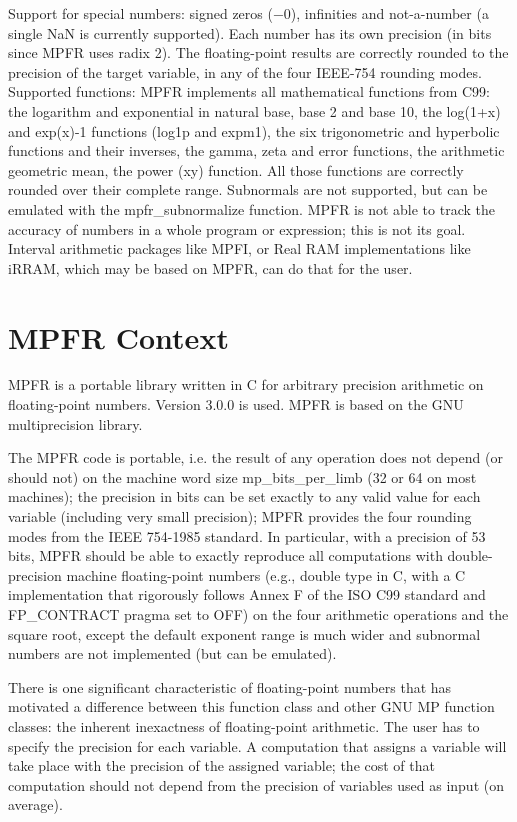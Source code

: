 Support for special numbers: signed zeros (−0), infinities and not-a-number (a single NaN is currently supported).
Each number has its own precision (in bits since MPFR uses radix 2). The floating-point results are correctly rounded to the precision of the target variable, in any of the four IEEE-754 rounding modes.
Supported functions: MPFR implements all mathematical functions from C99: the logarithm and exponential in natural base, base 2 and base 10, the log(1+x) and exp(x)-1 functions (log1p and expm1), the six trigonometric and hyperbolic functions and their inverses, the gamma, zeta and error functions, the arithmetic geometric mean, the power (xy) function. All those functions are correctly rounded over their complete range.
Subnormals are not supported, but can be emulated with the mpfr\_subnormalize function.
MPFR is not able to track the accuracy of numbers in a whole program or expression; this is not its goal. Interval arithmetic packages like MPFI, or Real RAM implementations like iRRAM, which may be based on MPFR, can do that for the user.




\section{MPFR Context}
\label{MPFRContext}

MPFR is a portable library written in C for arbitrary precision arithmetic on floating-point numbers. Version 3.0.0 is used. MPFR is based on the GNU multiprecision library.

\vspace{0.3cm}
The MPFR code is portable, i.e. the result of any operation does not depend (or should not) on the machine word size mp\_bits\_per\_limb (32 or 64 on most machines); 
the precision in bits can be set exactly to any valid value for each variable (including very small precision); 
MPFR provides the four rounding modes from the IEEE 754-1985 standard. 
In particular, with a precision of 53 bits, MPFR should be able to exactly reproduce all computations with double-precision machine floating-point numbers (e.g., double type in C, with a C implementation that rigorously follows Annex F of the ISO C99 standard and FP\_CONTRACT pragma set to OFF) on the four arithmetic operations and the square root, except the default exponent range is much wider and subnormal numbers are not implemented (but can be emulated). 

\vspace{0.3cm}
There is one significant characteristic of floating-point numbers that has motivated a difference between this function class and other GNU MP function classes: the inherent inexactness of floating-point arithmetic. The user has to specify the precision for each variable. A computation that assigns a variable will take place with the precision of the assigned variable; the cost of that computation should not depend from the precision of variables used as input (on average). 

